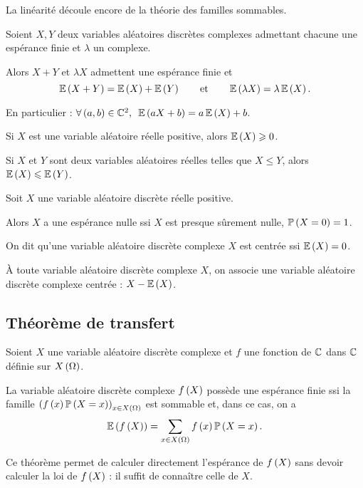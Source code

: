 La linéarité découle encore de la théorie des familles sommables.

\begin{prop}
Soient \(X,Y\) deux variables aléatoires discrètes complexes admettant chacune une espérance finie et \(\lambda\) un complexe.

Alors \(X+Y\) et \(\lambda X\) admettent une espérance finie et \[\operatorname{\mathbb{E}}\left(X+Y\right)=\operatorname{\mathbb{E}}\left(X\right)+\operatorname{\mathbb{E}}\left(Y\right)\qquad\text{et}\qquad\operatorname{\mathbb{E}}\left(\lambda X\right)=\lambda\operatorname{\mathbb{E}}\left(X\right).\]

En particulier : \(\quantifs{\forall\paren{a,b}\in\C^2}\esp{aX+b}=a\esp{X}+b\).

Si \(X\) est une variable aléatoire réelle positive, alors \(\operatorname{\mathbb{E}}\left(X\right)\geqslant0\).

Si \(X\) et \(Y\) sont deux variables aléatoires réelles telles que \(X\leq Y\), alors \(\operatorname{\mathbb{E}}\left(X\right)\leqslant\operatorname{\mathbb{E}}\left(Y\right)\).
\end{prop}

\begin{prop}
Soit \(X\) une variable aléatoire discrète réelle positive.

Alors \(X\) a une espérance nulle ssi \(X\) est presque sûrement nulle, \ie \(\mathbb{P}\left(X=0\right)=1\).
\end{prop}

\begin{defi}
On dit qu'une variable aléatoire discrète complexe \(X\) est centrée ssi \(\operatorname{\mathbb{E}}\left(X\right)=0\).
\end{defi}

À toute variable aléatoire discrète complexe \(X\), on associe une variable aléatoire discrète complexe centrée : \(X-\operatorname{\mathbb{E}}\left(X\right)\).

\subsection{Théorème de transfert}

\begin{theo}
Soient \(X\) une variable aléatoire discrète complexe et \(f\) une fonction de \(\mathbb{C}\) dans \(\mathbb{C}\) définie sur \(X\left(\Omega\right)\).

La variable aléatoire discrète complexe \(f\left(X\right)\) possède une espérance finie ssi la famille \(\left(f\left(x\right)\mathbb{P}\left(X=x\right)\right)_{x\in X\left(\Omega\right)}\) est sommable et, dans ce cas, on a \[\operatorname{\mathbb{E}}\left(f\left(X\right)\right)=\sum_{x\in X\left(\Omega\right)}f\left(x\right)\mathbb{P}\left(X=x\right).\]
\end{theo}

Ce théorème permet de calculer directement l'espérance de \(f\left(X\right)\) sans devoir calculer la loi de \(f\left(X\right)\) : il suffit de connaître celle de \(X\).

